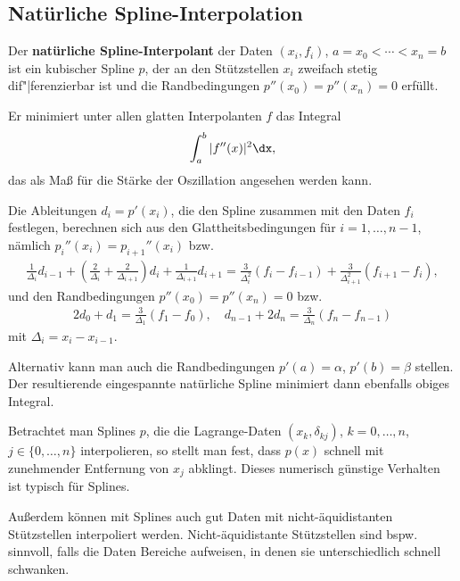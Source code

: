 \subsection{%
    Natürliche Spline-Interpolation%
}

Der \textbf{natürliche Spline-Interpolant} der Daten $(x_i, f_i)$,
$a = x_0 < \dotsb < x_n = b$ ist ein kubischer Spline $p$, der an den
Stützstellen $x_i$ zweifach stetig dif"|ferenzierbar ist und die
Randbedingungen $p''(x_0) = p''(x_n) = 0$ erfüllt.

Er minimiert unter allen glatten Interpolanten $f$ das Integral
\begin{align*}
    \int_a^b |f''(x)|^2 \dx,
\end{align*}
das als Maß für die Stärke der Oszillation angesehen werden kann.

\linie

Die Ableitungen $d_i = p'(x_i)$, die den Spline zusammen mit den Daten $f_i$
festlegen, berechnen sich aus den Glattheitsbedingungen für
$i = 1, \dotsc, n - 1$, nämlich $p_i''(x_i) = p_{i+1}''(x_i)$ bzw.
\begin{align*}
    \frac{1}{\Delta_i} d_{i-1} +
    \left(\frac{2}{\Delta_i} + \frac{2}{\Delta_{i+1}}\right) d_i +
    \frac{1}{\Delta_{i+1}} d_{i+1} =
    \frac{3}{\Delta_i^2} (f_i - f_{i-1}) +
    \frac{3}{\Delta_{i+1}^2} (f_{i+1} - f_i),
\end{align*}
und den Randbedingungen $p''(x_0) = p''(x_n) = 0$ bzw.
\begin{align*}
    2d_0 + d_1 =
    \frac{3}{\Delta_1} (f_1 - f_0), \quad
    d_{n-1} + 2d_n =
    \frac{3}{\Delta_n} (f_n - f_{n-1})
\end{align*}
mit $\Delta_i = x_i - x_{i-1}$.

Alternativ kann man auch die Randbedingungen $p'(a) = \alpha$,
$p'(b) = \beta$ stellen.
Der resultierende eingespannte natürliche Spline minimiert dann ebenfalls
obiges Integral.

\linie

Betrachtet man Splines $p$, die die Lagrange-Daten $(x_k, \delta_{kj})$,
$k = 0, \dotsc, n$, $j \in \{0, \dotsc, n\}$ interpolieren, so stellt man fest,
dass $p(x)$ schnell mit zunehmender Entfernung von $x_j$ abklingt.
Dieses numerisch günstige Verhalten ist typisch für Splines.

Außerdem können mit Splines auch gut Daten mit nicht-äquidistanten
Stützstellen interpoliert werden.
Nicht-äquidistante Stützstellen sind bspw. sinnvoll, falls die Daten Bereiche
aufweisen, in denen sie unterschiedlich schnell schwanken.

